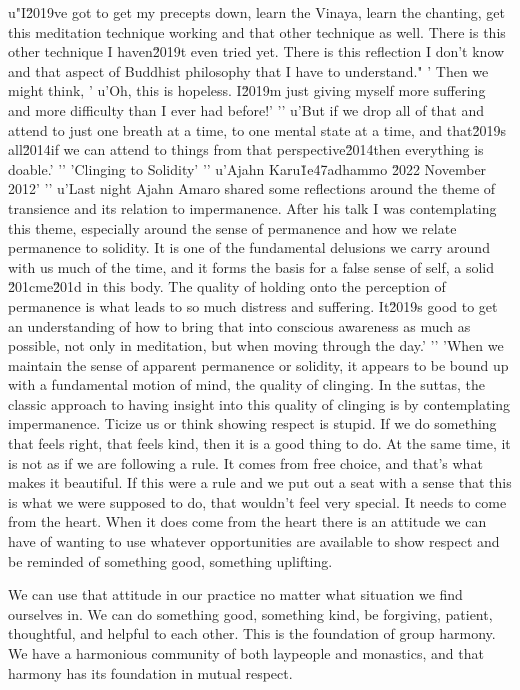 u"I\u2019ve got to get my precepts down, learn the Vinaya, learn the chanting, get this meditation technique working and that other technique as well. There is this other technique I haven\u2019t even tried yet. There is this reflection I don't know and that aspect of Buddhist philosophy that I have to understand."
' Then we might think, '
u'Oh, this is hopeless. I\u2019m just giving myself more suffering and more difficulty than I ever had before!'
'\n'
u'But if we drop all of that and attend to just one breath at a time, to one mental state at a time, and that\u2019s all\u2014if we can attend to things from that perspective\u2014then everything is doable.'
'\n'
'Clinging to Solidity'
'\n'
u'Ajahn Karu\u1e47adhammo \u2022 November 2012'
'\n'
u'Last night Ajahn Amaro shared some reflections around the theme of transience and its relation to impermanence. After his talk I was contemplating this theme, especially around the sense of permanence and how we relate permanence to solidity. It is one of the fundamental delusions we carry around with us much of the time, and it forms the basis for a false sense of self, a solid \u201cme\u201d in this body. The quality of holding onto the perception of permanence is what leads to so much distress and suffering. It\u2019s good to get an understanding of how to bring that into conscious awareness as much as possible, not only in meditation, but when moving through the day.'
'\n'
'When we maintain the sense of apparent permanence or solidity, it appears to be bound up with a fundamental motion of mind, the quality of clinging. In the suttas, the classic approach to having insight into this quality of clinging is by contemplating impermanence. Ticize us or think showing respect is 
stupid. If we do something that feels right, that feels kind, then it 
is a good thing to do. At the same time, it is not as if we are 
following a rule. It comes from free choice, and that's what makes it 
beautiful. If this were a rule and we put out a seat with a sense that 
this is what we were supposed to do, that wouldn't feel very special. 
It needs to come from the heart. When it does come from the heart there 
is an attitude we can have of wanting to use whatever opportunities are 
available to show respect and be reminded of something good, something 
uplifting.

We can use that attitude in our practice no matter what situation we 
find ourselves in. We can do something good, something kind, be 
forgiving, patient, thoughtful, and helpful to each other. This is the 
foundation of group harmony. We have a harmonious community of both 
laypeople and monastics, and that harmony has its foundation in mutual 
respect.

